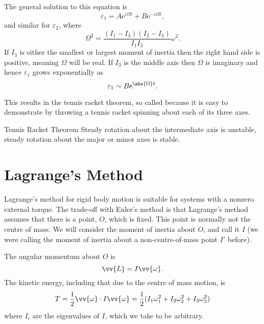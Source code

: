 \documentclass[fleqn]{NotesClass}
\newcommand*{\e}{\mathrm{e}}
\begin{document}
    The general solution to this equation is
    \begin{equation}
        \varepsilon_1 = A\e^{i\Omega t} + B\e^{-i\Omega t},
    \end{equation}
    and similar for \(\varepsilon_2\), where
    \begin{equation}
        \Omega^2 = \frac{(I_1 - I_3)(I_2 - I_3)}{I_1I_2}\omega^2.
    \end{equation}
    If \(I_3\) is either the smallest or largest moment of inertia then the right hand side is positive, meaning \(\Omega\) will be real.
    If \(I_3\) is the middle axis then \(\Omega\) is imaginary and hence \(\varepsilon_1\) grows exponentially as
    \begin{equation}
        \varepsilon_1 \sim B\e^{\abs{\Omega}t}.
    \end{equation}
    
    This results in the tennis racket theorem, so called because it is easy to demonstrate by throwing a tennis racket spinning about each of its three axes.
    \begin{thm}{Tennis Racket Theorem}{}
        Steady rotation about the intermediate axis is unstable, steady rotation about the major or minor axes is stable.
    \end{thm}
    
    \chapter{Lagrange's Method}
    Lagrange's method for rigid body motion is suitable for systems with a nonzero external torque.
    The trade-off with Euler's method is that Lagrange's method assumes that there is a point, \(O\), which is fixed.
    This point is normally not the centre of mass.
    We will consider the moment of inertia about \(O\), and call it \(I\) (we were calling the moment of inertia about a non-centre-of-mass point \(I'\) before).
    
    The angular momentum about \(O\) is
    \begin{equation}
        \vv{L} = I\vv{\omega}.
    \end{equation}
    The kinetic energy, including that due to the centre of mass motion, is
    \begin{equation}
        T = \frac{1}{2}\vv{\omega} \cdot I \vv{\omega} = \frac{1}{2}(I_1\omega_1^2 + I_2\omega_2^2 + I_3\omega_3^2)
    \end{equation}
    where \(I_i\) are the eigenvalues of \(I\), which we take to be arbitrary.
    
\end{document}
